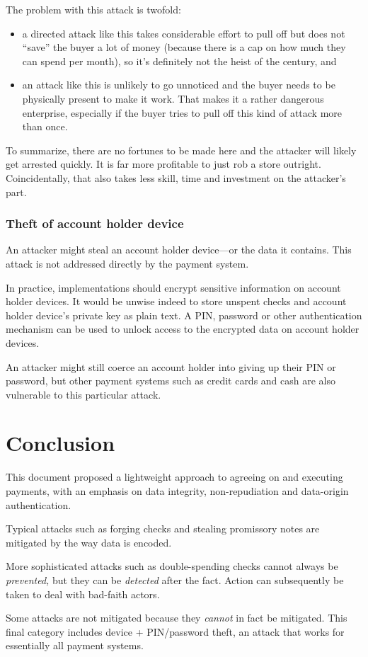 \documentclass[12pt,a4paper]{article}
\begin{document}
\begin{multicols}{2}
	The problem with this attack is twofold:

	\begin{itemize}
		\item a directed attack like this takes considerable effort to pull off but does not ``save'' the buyer a lot of money (because there is a cap on how much they can spend per month), so it's definitely not the heist of the century, and
		\item an attack like this is unlikely to go unnoticed and the buyer needs to be physically present to make it work. That makes it a rather dangerous enterprise, especially if the buyer tries to pull off this kind of attack more than once.
	\end{itemize}

	To summarize, there are no fortunes to be made here and the attacker will likely get arrested quickly. It is far more profitable to just rob a store outright. Coincidentally, that also takes less skill, time and investment on the attacker's part.

	\subsubsection{Theft of account holder device}

	An attacker might steal an account holder device---or the data it contains. This attack is not addressed directly by the payment system.

	In practice, implementations should encrypt sensitive information on account holder devices. It would be unwise indeed to store unspent checks and account holder device's private key as plain text. A PIN, password or other authentication mechanism can be used to unlock access to the encrypted data on account holder devices.

	An attacker might still coerce an account holder into giving up their PIN or password, but other payment systems such as credit cards and cash are also vulnerable to this particular attack.

	\section{Conclusion}

	This document proposed a lightweight approach to agreeing on and executing payments, with an emphasis on data integrity, non-repudiation and data-origin authentication.
	
	Typical attacks such as forging checks and stealing promissory notes are mitigated by the way data is encoded.

	More sophisticated attacks such as double-spending checks cannot always be \emph{prevented,} but they can be \emph{detected} after the fact. Action can subsequently be taken to deal with bad-faith actors.

	Some attacks are not mitigated because they \emph{cannot} in fact be mitigated. This final category includes device + PIN/password theft, an attack that works for essentially all payment systems.

	
	 

	\end{multicols}
\end{document}
